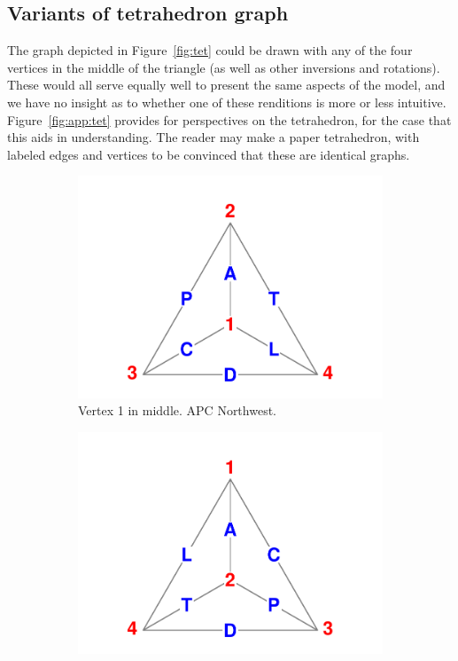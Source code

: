 \documentclass[11pt,oneside,a4paper]{article} %
\newcommand\vt[1]{\textcolor{rd}{#1}}
\newcommand\eg[1]{\textcolor{bl}{#1}}
\begin{document}
\begin{appendices}
\section{Variants of tetrahedron graph}
The graph depicted in Figure~\ref{fig:tet} could be drawn with any of the
four vertices in the middle of the triangle (as well as other inversions
and rotations).
These would all serve equally well to present the same aspects of the model, and
we have no insight as to whether one of these renditions is more or less
intuitive. Figure~\ref{fig:app:tet} provides for perspectives on the
tetrahedron, for the case that this aids in understanding. The reader may make a
paper tetrahedron, with labeled edges and vertices to be convinced that
these are identical graphs.
\begin{figure}
        \centering
        \caption{Some variants of the graph of the APCTDL tetrahedron.} 
         \label{fig:app:tet}
        \begin{subfigure}[b]{0.475\textwidth}
            \centering
            \includegraphics[width=\textwidth]{Figures/Tetra1.pdf}
           \caption{\small Vertex \vt{1} in middle. \eg{APC} Northwest.}
            \label{fig:tet1}
        \end{subfigure}
        \hfill
        \begin{subfigure}[b]{0.475\textwidth}  
            \centering 
            \includegraphics[width=\textwidth]{Figures/Tetra2.pdf}

\end{subfigure}
\end{figure}
\end{appendices}
\end{document}
